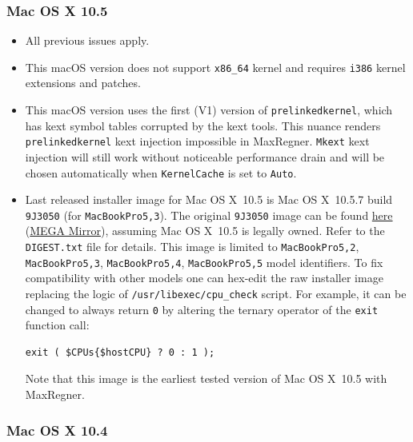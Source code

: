 \documentclass[]{article}
\makeatletter
\renewcommand{\label}[1]{%
\zref@wrapper@immediate{\oldlabel{#1}}}  %
\makeatother
\begin{document}
\subsubsection{Mac OS X 10.5}\label{legacy105}

\begin{itemize}
  \item All previous issues apply.
  \item This macOS version does not support \texttt{x86\_64} kernel
    and requires \texttt{i386} kernel extensions and patches.
  \item This macOS version uses the first (V1) version of \texttt{prelinkedkernel},
    which has kext symbol tables corrupted by the kext tools. This nuance
    renders \texttt{prelinkedkernel} kext injection impossible in MaxRegner.
    \texttt{Mkext} kext injection will still work without noticeable
    performance drain and will be chosen automatically when
    \texttt{KernelCache} is set to \texttt{Auto}.
  \item Last released installer image for Mac OS X~10.5 is Mac OS X~10.5.7
    build \texttt{9J3050} (for \texttt{MacBookPro5,3}). The original \texttt{9J3050} image can be found
    \href{https://archive.org/details/10.5.7-9-j-3050}{here}
    (\href{https://mega.nz/folder/inRBTarD#zanf7fUbviwz3WHBU5xpCg}{MEGA Mirror}),
    assuming Mac OS X~10.5 is legally owned. Refer to the \texttt{DIGEST.txt} file
    for details. This image is limited to \texttt{MacBookPro5,2}, \texttt{MacBookPro5,3},
    \texttt{MacBookPro5,4}, \texttt{MacBookPro5,5} model identifiers.
    To fix compatibility with other models one can hex-edit the raw installer image replacing
    the logic of \texttt{/usr/libexec/cpu\_check} script. For example, it can be changed
    to always return \texttt{0} by altering the ternary operator of the \texttt{exit} function call:
\begin{lstlisting}[label=hex105, style=ocbash]
exit ( $CPUs{$hostCPU} ? 0 : 1 );
\end{lstlisting}
    Note that this image is the earliest tested version of Mac OS X~10.5 with MaxRegner.
\end{itemize}

\subsubsection{Mac OS X 10.4}\label{legacy104}
\end{document}
